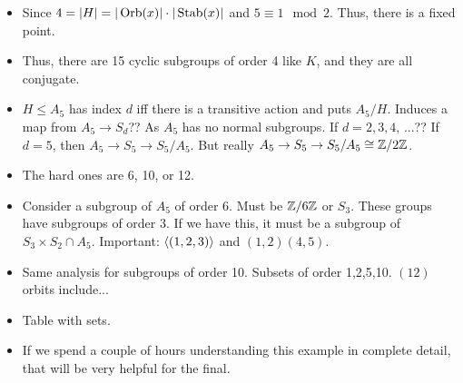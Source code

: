 \documentclass[../notes.tex]{subfiles}
\begin{document}
\begin{itemize}
    \item Since $4=|H|=|\operatorname{Orb}(x)|\cdot|\operatorname{Stab}(x)|$ and $5\equiv 1\mod 2$. Thus, there is a fixed point.
    \item Thus, there are 15 cyclic subgroups of order 4 like $K$, and they are all conjugate.
    \item $H\leq A_5$ has index $d$ iff there is a transitive action and puts $A_5/H$. Induces a map from $A_5\to S_d$?? As $A_5$ has no normal subgroups. If $d=2,3,4$, ...?? If $d=5$, then $A_5\to S_5\to S_5/A_5$. But really $A_5\to S_5\to S_5/A_5\cong\mathbb{Z}/2\mathbb{Z}$.
    \item The hard ones are 6, 10, or 12.
    \item Consider a subgroup of $A_5$ of order 6. Must be $\mathbb{Z}/6\mathbb{Z}$ or $S_3$. These groups have subgroups of order 3. If we have this, it must be a subgroup of $S_3\times S_2\cap A_5$. Important: $\left\langle{(1,2,3)}\right\rangle$ and $(1,2)(4,5)$.
    \item Same analysis for subgroups of order 10. Subsets of order 1,2,5,10. $(12)$ orbits include...
    \item Table with sets.
    \item If we spend a couple of hours understanding this example in complete detail, that will be very helpful for the final.
\end{itemize}
\end{document}
